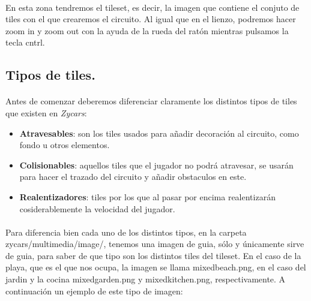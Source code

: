 \paragraph{}
En esta zona tendremos el tileset, es decir, la imagen que contiene el conjuto de tiles con el que crearemos el circuito.
Al igual que en el lienzo, podremos hacer zoom in y zoom out con la ayuda de la rueda del ratón mientras pulsamos la tecla
cntrl.

\subsection{Tipos de tiles.}

\paragraph{}
Antes de comenzar deberemos diferenciar claramente los distintos tipos de tiles que existen en \emph{Zycars}:

\begin{itemize}
    \item \textbf{Atravesables}: son los tiles usados para añadir decoración al circuito, como fondo u otros elementos.
    \item \textbf{Colisionables}: aquellos tiles que el jugador no podrá atravesar, se usarán para hacer el trazado del circuito
    y añadir obstaculos en este.
    \item \textbf{Realentizadores}: tiles por los que al pasar por encima realentizarán cosiderablemente la velocidad del jugador.
\end{itemize}

\paragraph{}
Para diferencia bien cada uno de los distintos tipos, en la carpeta zycars/multimedia/image/, tenemos una imagen de guia, sólo
y únicamente sirve de guia, para saber de que tipo son los distintos tiles del tileset. En el caso de la playa, que es el que nos
ocupa, la imagen se llama mixedbeach.png, en el caso del jardin y la cocina mixedgarden.png y mixedkitchen.png, respectivamente.
A continuación un ejemplo de este tipo de imagen:

